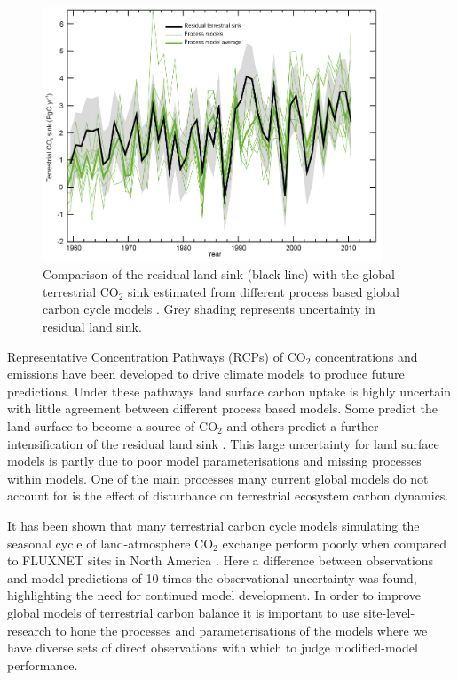 \begin{figure}[ht]
    \centering
    \includegraphics[width=0.9\textwidth]{chapter/chapter1/ipcc_fig6_16.jpg}
    \caption{Comparison of the residual land sink (black line) with the global terrestrial CO\(_{2}\) sink estimated from different process based global carbon cycle models \citep{ciais2014carbon}. Grey shading represents uncertainty in residual land sink.}
    \label{chap1:fig:ipcc_fig6.16}
\end{figure}

Representative Concentration Pathways (RCPs) of CO\(_{2}\) concentrations and emissions have been developed \citep{moss2010next} to drive climate models to produce future predictions. Under these pathways land surface carbon uptake is highly uncertain with little agreement between different process based models. Some predict the land surface to become a source of CO\(_{2}\) and others predict a further intensification of the residual land sink \citep{jones2013twenty}. This large uncertainty for land surface models is partly due to poor model parameterisations and missing processes within models. One of the main processes many current global models do not account for is the effect of disturbance on terrestrial ecosystem carbon dynamics.

It has been shown that many terrestrial carbon cycle models simulating the seasonal cycle of land-atmosphere CO\(_{2}\) exchange perform poorly when compared to FLUXNET sites in North America \citep{schwalm2010model}. Here a difference between observations and model predictions of 10 times the observational uncertainty was found, highlighting the need for continued model development. In order to improve global models of terrestrial carbon balance it is important to use site-level-research to hone the processes and parameterisations of the models where we have diverse sets of direct observations with which to judge modified-model performance. 


